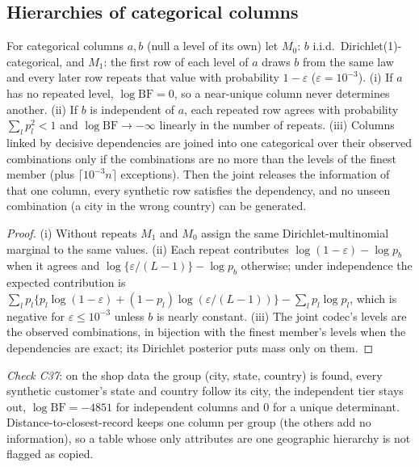 \subsection{Hierarchies of categorical columns}
\begin{proposition}\label{prop:fd}
For categorical columns $a,b$ (null a level of its own) let $M_0$: $b$ i.i.d.\ Dirichlet(1)-categorical, and $M_1$: the first row of each level of $a$ draws $b$ from the same law and every later row repeats that value with probability $1-\varepsilon$ ($\varepsilon=10^{-3}$). (i) If $a$ has no repeated level, $\log\mathrm{BF}=0$, so a near-unique column never determines another. (ii) If $b$ is independent of $a$, each repeated row agrees with probability $\sum_lp_l^2<1$ and $\log\mathrm{BF}\to-\infty$ linearly in the number of repeats. (iii) Columns linked by decisive dependencies are joined into one categorical over their observed combinations only if the combinations are no more than the levels of the finest member (plus $\lceil10^{-3}n\rceil$ exceptions). Then the joint releases the information of that one column, every synthetic row satisfies the dependency, and no unseen combination (a city in the wrong country) can be generated.
\end{proposition}
\begin{proof}
(i) Without repeats $M_1$ and $M_0$ assign the same Dirichlet-multinomial marginal to the same values. (ii) Each repeat contributes $\log(1-\varepsilon)-\log p_{b}$ when it agrees and $\log\{\varepsilon/(L-1)\}-\log p_b$ otherwise; under independence the expected contribution is $\sum_lp_l\{p_l\log(1-\varepsilon)+(1-p_l)\log(\varepsilon/(L-1))\}-\sum_lp_l\log p_l$, which is negative for $\varepsilon\le10^{-3}$ unless $b$ is nearly constant. (iii) The joint codec's levels are the observed combinations, in bijection with the finest member's levels when the dependencies are exact; its Dirichlet posterior puts mass only on them.
\end{proof}
\noindent\emph{Check C37}: on the shop data the group (city, state, country) is found, every synthetic customer's state and country follow its city, the independent tier stays out, $\log\mathrm{BF}=-4851$ for independent columns and $0$ for a unique determinant. Distance-to-closest-record keeps one column per group (the others add no information), so a table whose only attributes are one geographic hierarchy is not flagged as copied.

